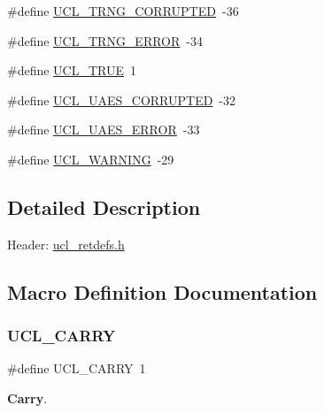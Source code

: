 \begin{DoxyCompactItemize}
\#define \hyperlink{group___u_c_l___r_e_t_u_r_n_gaa0a103590fcf2d1ab7435c0a065ab7c0}{U\+C\+L\+\_\+\+T\+R\+N\+G\+\_\+\+C\+O\+R\+R\+U\+P\+T\+ED}~-\/36
\item 
\#define \hyperlink{group___u_c_l___r_e_t_u_r_n_gabfb30f7a53ff4e919deefe774bfd3e1f}{U\+C\+L\+\_\+\+T\+R\+N\+G\+\_\+\+E\+R\+R\+OR}~-\/34
\item 
\#define \hyperlink{group___u_c_l___r_e_t_u_r_n_ga4498f15eb17d0532d8c3d1db72502f09}{U\+C\+L\+\_\+\+T\+R\+UE}~1
\item 
\#define \hyperlink{group___u_c_l___r_e_t_u_r_n_gaba7ba8db070222df831530fc3e812776}{U\+C\+L\+\_\+\+U\+A\+E\+S\+\_\+\+C\+O\+R\+R\+U\+P\+T\+ED}~-\/32
\item 
\#define \hyperlink{group___u_c_l___r_e_t_u_r_n_ga2bc1728bb7048231ec416e9b5abeaa11}{U\+C\+L\+\_\+\+U\+A\+E\+S\+\_\+\+E\+R\+R\+OR}~-\/33
\item 
\#define \hyperlink{group___u_c_l___r_e_t_u_r_n_ga7ad179c2a68343f3c8275ae412688a6d}{U\+C\+L\+\_\+\+W\+A\+R\+N\+I\+NG}~-\/29
\end{DoxyCompactItemize}


\subsection{Detailed Description}
\begin{DoxyParagraph}{Header\+:}
\hyperlink{ucl__retdefs_8h}{ucl\+\_\+retdefs.\+h } 
\end{DoxyParagraph}


\subsection{Macro Definition Documentation}
\mbox{\label{group___u_c_l___r_e_t_u_r_n_ga0dce5f26cc3acf0bcca51853edc2b10f}} 
\subsubsection{\texorpdfstring{U\+C\+L\+\_\+\+C\+A\+R\+RY}{UCL\_CARRY}}
{\footnotesize\ttfamily \#define U\+C\+L\+\_\+\+C\+A\+R\+RY~1}

{\bfseries Carry}. \mbox{\label{group___u_c_l___r_e_t_u_r_n_gafc7aaea99d505ed3f41233839c2cb931}} 
